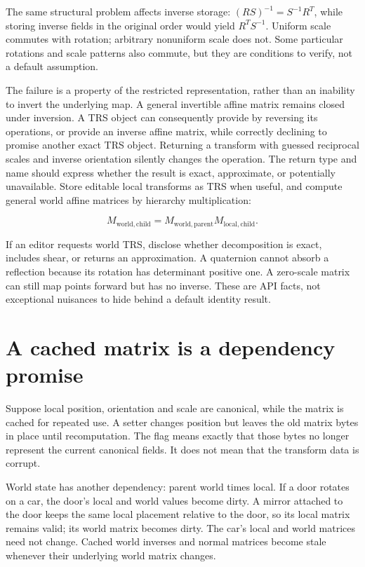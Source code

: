 The same structural problem affects inverse storage: \((RS)^{-1}=S^{-1}R^T\), while storing inverse fields in the original order would yield \(R^TS^{-1}\). Uniform scale commutes with rotation; arbitrary nonuniform scale does not. Some particular rotations and scale patterns also commute, but they are conditions to verify, not a default assumption.

The failure is a property of the restricted representation, rather than an inability to invert the underlying map. A general invertible affine matrix remains closed under inversion. A TRS object can consequently provide  by reversing its operations, or provide an inverse affine matrix, while correctly declining to promise another exact TRS object. Returning a transform with guessed reciprocal scales and inverse orientation silently changes the operation. The return type and name should express whether the result is exact, approximate, or potentially unavailable. Store editable local transforms as TRS when useful, and compute general world affine matrices by hierarchy multiplication:

\[
M_{\mathrm{world,child}}=M_{\mathrm{world,parent}}M_{\mathrm{local,child}}.
\]

If an editor requests world TRS, disclose whether decomposition is exact, includes shear, or returns an approximation. A quaternion cannot absorb a reflection because its rotation has determinant positive one. A zero-scale matrix can still map points forward but has no inverse. These are API facts, not exceptional nuisances to hide behind a default identity result.

\section{A cached matrix is a dependency promise}\label{01-foundations-i-ch019-a-cached-matrix-is-a-dependency-promise}

\hypertarget{01-foundations-i-ch019-a-cached-matrix-is-a-dependency-promise}{}

Suppose local position, orientation and scale are canonical, while the matrix is cached for repeated use. A setter changes position but leaves the old matrix bytes in place until recomputation. The flag  means exactly that those bytes no longer represent the current canonical fields. It does not mean that the transform data is corrupt.

World state has another dependency: parent world times local. If a door rotates on a car, the door's local and world values become dirty. A mirror attached to the door keeps the same local placement relative to the door, so its local matrix remains valid; its world matrix becomes dirty. The car's local and world matrices need not change. Cached world inverses and normal matrices become stale whenever their underlying world matrix changes.


